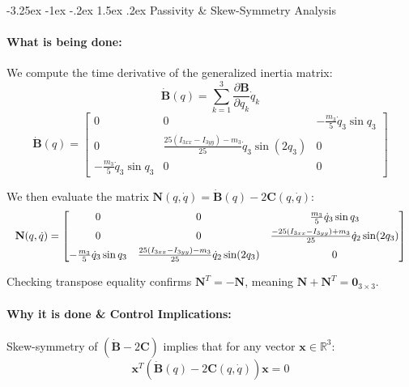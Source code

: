 \documentclass[11pt, a4paper]{article}
\makeatletter
\renewcommand{\subsection}{\@startsection{subsection}{2}{\z@}%
    {-3.25ex \@plus -1ex \@minus -.2ex}%
    {1.5ex \@plus .2ex}%
    {\normalfont\large\bfseries\color{brandaccent}}}
\makeatother
\begin{document}
\subsection{Passivity \& Skew-Symmetry Analysis}
\paragraph{What is being done:}
We compute the time derivative of the generalized inertia matrix:
\begin{equation}
    \mathbf{\dot{B}}(q) = \sum_{k=1}^3 \frac{\partial \mathbf{B}}{\partial q_k} \dot{q}_k
\end{equation}
\begin{equation}
\mathbf{\dot{B}}(q) = \begin{bmatrix}
0 & 0 & -\frac{m_3}{5}\dot{q}_3\sin q_3 \\[0.4em]
0 & \frac{25(I_{3xx}-I_{3yy})-m_3}{25}\dot{q}_3\sin(2q_3) & 0 \\[0.4em]
-\frac{m_3}{5}\dot{q}_3\sin q_3 & 0 & 0
\end{bmatrix}
\end{equation}

We then evaluate the matrix $\mathbf{N}(q, \dot{q}) = \mathbf{\dot{B}}(q) - 2\mathbf{C}(q, \dot{q})$:
\begin{equation}
\resizebox{\linewidth}{!}{$
\mathbf{N}(q, \dot{q}) = \begin{bmatrix}
0 & 0 & \frac{m_3}{5}\dot{q}_3\sin q_3 \\[0.4em]
0 & 0 & \frac{-25(I_{3xx}-I_{3yy})+m_3}{25}\dot{q}_2\sin(2q_3) \\[0.4em]
-\frac{m_3}{5}\dot{q}_3\sin q_3 & \frac{25(I_{3xx}-I_{3yy})-m_3}{25}\dot{q}_2\sin(2q_3) & 0
\end{bmatrix}
$}
\end{equation}

Checking transpose equality confirms $\mathbf{N}^T = -\mathbf{N}$, meaning $\mathbf{N} + \mathbf{N}^T = \mathbf{0}_{3\times3}$.

\paragraph{Why it is done \& Control Implications:}
Skew-symmetry of $(\mathbf{\dot{B}} - 2\mathbf{C})$ implies that for any vector $\mathbf{x} \in \mathbb{R}^3$:
\begin{equation}
    \mathbf{x}^T \left( \mathbf{\dot{B}}(q) - 2\mathbf{C}(q, \dot{q}) \right) \mathbf{x} = 0
\end{equation}
\end{document}
